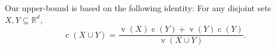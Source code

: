\documentclass{cccg10}
\DeclareMathOperator{\vol}{v}
\DeclareMathOperator{\cog}{c}
\newcommand{\R}{\mathbb{R}}
\begin{document}
Our upper-bound is based on the following identity:  For any disjoint sets
$X,Y\subseteq\R^d$, 
\[\cog(X \cup Y) = \frac{\vol(X)\cog(Y) + \vol(Y)\cog(Y)}{\vol(X \cup Y)}.\]


%
%
%
\end{document}

